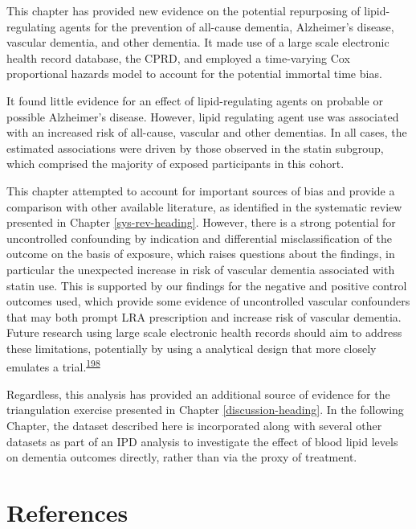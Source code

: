 \documentclass[a4paper, twoside]{templates/ociamthesis}
\begin{document}
This chapter has provided new evidence on the potential repurposing of lipid-regulating agents for the prevention of all-cause dementia, Alzheimer's disease, vascular dementia, and other dementia. It made use of a large scale electronic health record database, the CPRD, and employed a time-varying Cox proportional hazards model to account for the potential immortal time bias.

It found little evidence for an effect of lipid-regulating agents on probable or possible Alzheimer's disease. However, lipid regulating agent use was associated with an increased risk of all-cause, vascular and other dementias. In all cases, the estimated associations were driven by those observed in the statin subgroup, which comprised the majority of exposed participants in this cohort.

This chapter attempted to account for important sources of bias and provide a comparison with other available literature, as identified in the systematic review presented in Chapter \ref{sys-rev-heading}. However, there is a strong potential for uncontrolled confounding by indication and differential misclassification of the outcome on the basis of exposure, which raises questions about the findings, in particular the unexpected increase in risk of vascular dementia associated with statin use. This is supported by our findings for the negative and positive control outcomes used, which provide some evidence of uncontrolled vascular confounders that may both prompt LRA prescription and increase risk of vascular dementia. Future research using large scale electronic health records should aim to address these limitations, potentially by using a analytical design that more closely emulates a trial.\textsuperscript{\protect\hyperlink{ref-danaei2013b}{198}}

Regardless, this analysis has provided an additional source of evidence for the triangulation exercise presented in Chapter \ref{discussion-heading}. In the following Chapter, the dataset described here is incorporated along with several other datasets as part of an IPD analysis to investigate the effect of blood lipid levels on dementia outcomes directly, rather than via the proxy of treatment.

\newpage

\hypertarget{references-3}{%
\section{References}\label{references-3}}
\end{document}
